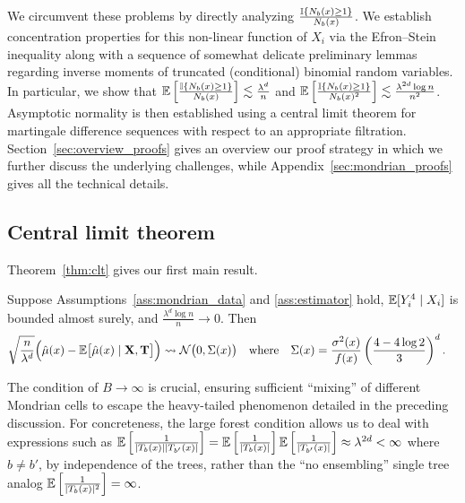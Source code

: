 We circumvent these problems by directly analyzing
$\frac{\mathbb{I}\{N_b(x) \geq 1\}}{N_b(x)}$.
We establish concentration properties
for this non-linear function of $X_i$ via the Efron--Stein inequality
\citep[Section 3.1]{boucheron2016concentration}
along with a sequence of somewhat delicate preliminary lemmas regarding
inverse moments of truncated (conditional) binomial random variables.
In particular, we show that
$\mathbb{E} \left[ \frac{\mathbb{I} \{N_b(x) \geq 1\}}{N_b(x)} \right]
\lesssim \frac{\lambda^d}{n}$
and
$\mathbb{E} \left[ \frac{\mathbb{I} \{N_b(x) \geq 1\}}{N_b(x)^2} \right]
\lesssim \frac{\lambda^{2d} \log n}{n^2}$.
Asymptotic normality is then established
using a central limit theorem for martingale difference sequences
\citep[Theorem~3.2]{hall2014martingale}
with respect to an appropriate filtration.
Section~\ref{sec:overview_proofs} gives an overview our proof strategy in
which  we further discuss the underlying challenges,
while Appendix~\ref{sec:mondrian_proofs} gives all the technical details.

\subsection{Central limit theorem}

Theorem~\ref{thm:clt} gives our first main result.

\begin{theorem}%
  \label{thm:clt}
  Suppose Assumptions~\ref{ass:mondrian_data} and \ref{ass:estimator} hold,
  $\mathbb{E}[Y_i^4 \mid X_i ]$ is bounded almost surely,
  and $\frac{\lambda^d \log n}{n} \to 0$. Then
  \begin{align*}
    \sqrt{\frac{n}{\lambda^d}}
    \Big(
      \hat \mu(x)
      - \mathbb{E} \big[ \hat \mu(x) \mid \mathbf{X}, \mathbf{T} \big]
    \Big)
    &\rightsquigarrow
    \mathcal{N}\big(0, \Sigma(x)\big)
    &                &\text{where}
    &\Sigma(x)
    &=
    \frac{\sigma^2(x)}{f(x)}
    \left(
      \frac{4 - 4 \log 2}{3 }
    \right)^d.
  \end{align*}
\end{theorem}

The condition of $B \to \infty$ is crucial,
ensuring sufficient ``mixing'' of different Mondrian cells to escape the
heavy-tailed phenomenon detailed in the preceding discussion.
For concreteness, the large forest condition allows us to deal
with expressions such as
$\mathbb{E} \left[ \frac{1}{|T_b(x)| |T_{b'}(x)|} \right] =
\mathbb{E} \left[ \frac{1}{|T_b(x)|} \right] \mathbb{E} \left[ \frac{1}{|T_{b'}(x)|} \right]
\approx \lambda^{2d} < \infty$
where $b \neq b'$, by independence of the trees, rather than
the ``no ensembling'' single tree analog
$\mathbb{E} \left[ \frac{1}{|T_b(x)|^2} \right] = \infty$.


